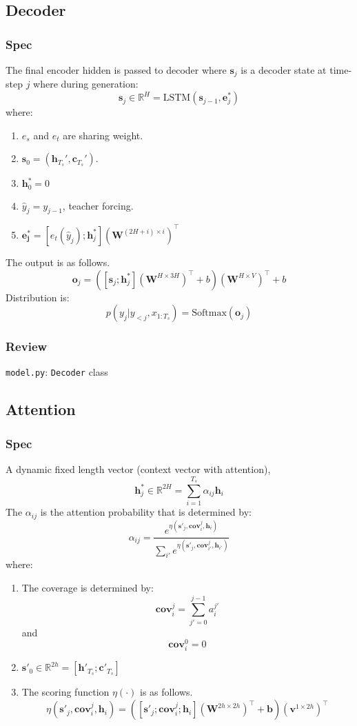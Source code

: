 \documentclass{article}
\begin{document}
  \subsection{Decoder}
  \subsubsection{Spec}
  The final encoder hidden is passed to decoder where $\mathbf{s}_j$ is a decoder state at time-step $j$ where during generation:
  \[
    \mathbf{s}_j \in \mathbb{R}^H = \text{LSTM}(\mathbf{s}_{j-1}, \mathbf{e}^*_{j})
  \]
  where:
  \begin{enumerate}
    \item $e_s$ and $e_t$ are sharing weight.
    \item $\mathbf{s}_0 = (\mathbf{h}_{T_s}',\mathbf{c}_{T_s}')$.
    \item $\mathbf{h}^*_0 = 0$
    \item $\hat{y}_j = y_{j-1}$, teacher forcing.
    \item $\mathbf{e^*_{j}} = [e_t(\hat{y}_{j}); \mathbf{h}^*_{j}] (\mathbf{W}^{(2H + i) \times i})^\intercal$
  \end{enumerate}
  The output is as follows.
  \[
    \mathbf{o}_j = ([\mathbf{s}_j;\mathbf{h}^*_j] (\mathbf{W}^{H \times 3H})^\intercal + b) (\mathbf{W}^{H\times V})^\intercal +b
  \]
  Distribution is:
  \[
    p(y_j|y_{<j}, x_{1:T_s}) = \text{Softmax}(\mathbf{o}_j)
  \]
  \subsubsection{Review}
  \texttt{model.py}: \texttt{Decoder} class
  \subsection{Attention}
  \subsubsection{Spec}
  A dynamic fixed length vector (context vector with attention),
  \[
    \mathbf{h}^*_j \in \mathbb{R}^{2H}= \sum_{i = 1}^{T_s} \alpha_{ij} \mathbf{h}_i
  \]
  The $\alpha_{ij}$ is the attention probability that is determined by:
  \[
    \alpha_{ij} = \frac{e^{\eta(\mathbf{s}'_j, \mathbf{cov}^{j}_{i}, \mathbf{h}_i)}}{\sum_{i'}e^{\eta(\mathbf{s}'_j, \mathbf{cov}^{j}_{i'},\mathbf{h}_{i'})}}
  \]
  where:
  \begin{enumerate}
    \item The coverage is determined by:
    \[
      \mathbf{cov}^{j}_{i} = \sum_{j'=0}^{j-1} a^{j'}_i
    \]
    and
    \[
      \mathbf{cov}^{0}_{i} = 0
    \]
    \item $\mathbf{s}'_0 \in \mathbb{R}^{2h} = [\mathbf{h}'_{T_s}; \mathbf{c}'_{T_s}]$
    \item The scoring function $\eta(\cdot)$ is as follows.
    \[
      \eta(\mathbf{s}'_{j}, \mathbf{cov}^{j}_{i}, \mathbf{h}_i) = ([\mathbf{s}'_{j}; \mathbf{cov}^{j}_{i}; \mathbf{h}_i] (\mathbf{W}^{2h\times 2h})^\intercal + \mathbf{b}) (\mathbf{v}^{1\times 2h})^\intercal
    \]
  \end{enumerate}
\end{document}
